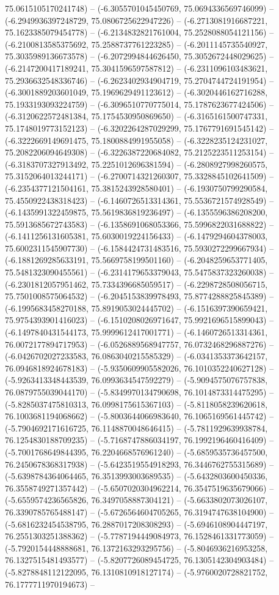 75.0615105170241748) -- (-6.3055701045450769, 75.0694336569746099) -- (-6.2949936397248729, 75.0806725622947226) -- (-6.2713081916687221, 75.1623385079454778) -- (-6.2134832821761004, 75.2528088054121156) -- (-6.2100813585375692, 75.2588737761223285) -- (-6.2011145735540927, 75.3035989136673578) -- (-6.2072994844626450, 75.3052672448029625) -- (-6.2147200417189241, 75.3041596597587812) -- (-6.2311096103483621, 75.2936632548336746) -- (-6.2623402934904719, 75.2704744724191954) -- (-6.3001889203601049, 75.1969629491123612) -- (-6.3020446162716288, 75.1933193093224759) -- (-6.3096510770775014, 75.1787623677424506) -- (-6.3120622572481384, 75.1754530950869650) -- (-6.3165161500747331, 75.1748019773152123) -- (-6.3202264287029299, 75.1767791691545142) -- (-6.3222669149691475, 75.1800884991955058) -- (-6.3228235124231027, 75.2082206094649308) -- (-6.3226387220684082, 75.2125223511253154) -- (-6.3183707327913492, 75.2251012696381594) -- (-6.2808927998260575, 75.3152064013244171) -- (-6.2700714321260307, 75.3328845102641509) -- (-6.2354377121504161, 75.3815243928580401) -- (-6.1930750799290584, 75.4550922438318423) -- (-6.1460726513314361, 75.5536721574928549) -- (-6.1435991322459875, 75.5619836819236497) -- (-6.1355596386208200, 75.5913685672743583) -- (-6.1358691068053366, 75.5996822031688822) -- (-6.1411256131605381, 75.6030019224156433) -- (-6.1479294604378003, 75.6002311545907730) -- (-6.1584424731483516, 75.5930272299667934) -- (-6.1881269285633191, 75.5669758199501160) -- (-6.2048259653771405, 75.5481323090455561) -- (-6.2314179653379043, 75.5475837323260038) -- (-6.2301812057951462, 75.7334396685059517) -- (-6.2298728508056715, 75.7501008575064532) -- (-6.2045153839978493, 75.8774288825845389) -- (-6.1995683458270188, 75.8919053024445702) -- (-6.1516397390659421, 75.9754393901416023) -- (-6.1510208026971647, 75.9921696515899043) -- (-6.1497840431544173, 75.9999612417001771) -- (-6.1460726513314361, 76.0072177894717953) -- (-6.0526889568947757, 76.0732468296887276) -- (-6.0426702027233583, 76.0863040215585329) -- (-6.0341353373642157, 76.0946818924678183) -- (-5.9350609905582026, 76.1010352240627128) -- (-5.9263413348443539, 76.0993634547592279) -- (-5.9094575076757838, 76.0879755039044170) -- (-5.8349970134790698, 76.1014873314475295) -- (-5.8285037475810313, 76.0998175615367103) -- (-5.8118058239620618, 76.1003681194068662) -- (-5.8003644066983640, 76.1065169561445742) -- (-5.7904692171616725, 76.1148870048646415) -- (-5.7811929639938784, 76.1254830188709235) -- (-5.7168747886034197, 76.1992196460416409) -- (-5.7001768649844395, 76.2204668576961240) -- (-5.6859535736457500, 76.2450678368317938) -- (-5.6423519554918293, 76.3446762755315689) -- (-5.6398784364064465, 76.3513993003689535) -- (-5.6432803600450336, 76.3558749271357442) -- (-5.6507020304962214, 76.3547519635679066) -- (-5.6559574236565826, 76.3497058887304121) -- (-5.6633802073026107, 76.3390785765488147) -- (-5.6726564604705265, 76.3194747638104900) -- (-5.6816232454538795, 76.2887017208308293) -- (-5.6946108904447197, 76.2551303251388362) -- (-5.7787194449084973, 76.1528461331773059) -- (-5.7920154448888681, 76.1372163293295756) -- (-5.8046936216953258, 76.1327515481493577) -- (-5.8207726089454725, 76.1305142304903484) -- (-5.8278848112122095, 76.1310810918127174) -- (-5.9760020728821752, 76.1777711970194673) -- 